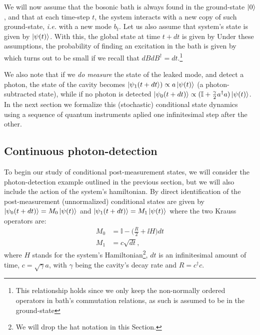 We will now assume that the bosonic bath is always found in the ground-state $\ket{0}$, and that at each time-step $t$, the system interacts with a new copy of such ground-state, \textit{i.e.} with a new mode $b_t$. Let us also assume that system's state is given by $\ket{\psi(t)}$. With this, the global state at time $t+dt$ is given by
Under these assumptions, the probability of finding an excitation in the bath is given by
 which turns out to be small if we recall that $dB dB^\dagger = dt$.\footnote{This relationship holds since we only keep the non-normally ordered operators in bath's commutation relations, as such is assumed to be in the ground-state}

We also note that if we \textit{do measure} the state of the leaked mode, and detect a photon, the state of the cavity becomes $\ket{\psi_{1}(t+dt})\propto a \ket{\psi(t)}$ (a photon-subtracted state), while if no photon is detected $\ket{\psi_{0}(t+dt)}\propto (\mathbb{I} + \frac{\gamma}{2}a^{\dagger}a)\ket{\psi(t)}$.
In the next section we formalize this (stochastic) conditional state dynamics using a sequence of quantum instruments aplied one  infinitesimal step after the other.

\subsection{Continuous photon-detection}\label{ssec:contphoto}

To begin our study of conditional post-measurement states, we will consider the photon-detection example outlined in the previous section, but we will also include the action of the system's hamiltonian. By
direct identification of the post-measurement (unnormalized) conditional states are given by
$\ket{\psi_0(t+dt)} =M_{0}\ket{\psi(t)}$ and $\ket{\psi_1(t+dt)} =M_{1}\ket{\psi(t)}$  where the two
 Krauss operators are:
\begin{align}\label{eq:photocoM}
M_0 &= \mathbb{I} - \Big(\frac{R}{2} + \ii H \Big) dt\\
M_1 &= c \sqrt{dt},
\end{align}
where $H$ stands for the system's Hamiltonian\footnote{We will drop the hat notation in this Section.}, $dt$ is an infinitesimal amount of time, $c = \sqrt{\gamma}a$, with $\gamma$ being the cavity's decay rate and $R=c^\dagger c$.

